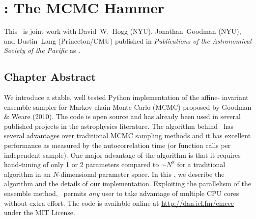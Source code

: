 \renewcommand{\chapid}{emcee}

\newcommand{\thisplain}{emcee}
\newcommand{\this}{\project{\thisplain}}
\newcommand{\license}{MIT License}
\newcommand{\Python}{\project{Python}}
\newcommand{\numpy}{\project{numpy}}
\newcommand{\Ubuntu}{\project{Ubuntu}}
\newcommand{\github}{\project{GitHub}}
\newcommand{\pip}{\project{pip}}
\newcommand{\acor}{\project{acor}}

\newcommand{\model}{\ensuremath{\vector{\Theta}}}
\newcommand{\data}{\ensuremath{\vector{D}}}
\newcommand{\nuisance}{\ensuremath{\vector{\alpha}}}
\newcommand{\link}{\ensuremath{X}}
\newcommand{\ensemble}{S}
\newcommand{\colorens}[1]{\ensemble^{(#1)}}
\newcommand{\red}{\colorens{0}}
\newcommand{\blue}{\colorens{1}}
\renewcommand{\vector}[1]{#1}
\renewcommand{\matrix}[1]{#1}

\chapter{\this: The MCMC Hammer\label{chap:emcee}}

This \paper\ is joint work with David~W.~Hogg (NYU), Jonathan~Goodman (NYU),
and Dustin~Lang (Princeton/CMU) published in \emph{Publications of the
Astronomical Society of the Pacific} as \citet{Foreman-Mackey:2013}.

\section{Chapter Abstract}

We introduce a stable, well tested Python implementation of the affine-%
invariant ensemble sampler for Markov chain Monte Carlo (MCMC)
proposed by Goodman \& Weare (2010). The code is open source and has
already been used in several published projects in the astrophysics
literature. The algorithm behind \this\ has several advantages over
traditional MCMC sampling methods and it has excellent performance as
measured by the autocorrelation time (or function calls per independent sample).
One major advantage of the algorithm is that it requires hand-tuning of
only 1 or 2 parameters compared to $\sim N^2$ for
a traditional algorithm in an $N$-dimensional parameter space. In this
\paper, we describe the algorithm and the details of our implementation.
Exploiting the parallelism of the ensemble method,
\this\ permits \emph{any} user to take advantage of
multiple CPU cores without extra effort.  The code is available online
at \url{http://dan.iel.fm/\thisplain} under the \license.

